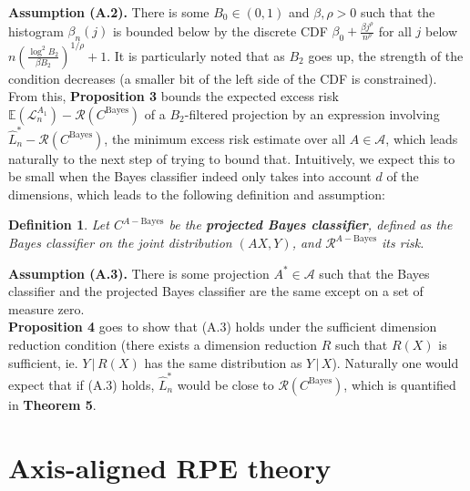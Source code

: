 \documentclass[ejs,preprint]{imsart}
\newtheorem{definition}{Definition}
\newcommand\cbayes{C^{\mathrm{Bayes}}}
\newcommand\risk{\mathcal{L}}
\newcommand\rrisk{\mathcal{R}}
\newcommand\cabayes{C^{A-\mathrm{Bayes}}}
\newcommand\rabayes{\rrisk^{A-\mathrm{Bayes}}}
\begin{document}
\noindent \textbf{Assumption (A.2).} There is some $B_{0}\in(0,1)$
and $\beta,\rho>0$ such that the histogram $\beta_{n}(j)$ is bounded
below by the discrete CDF $\beta_{0}+\frac{\beta j^{\rho}}{n^{\rho}}$
for all $j$ below $n\left(\frac{\log^{2}B_{2}}{\beta B_{2}}\right)^{1/\rho}+1$.
It is particularly noted that as $B_{2}$ goes up, the strength of
the condition decreases (a smaller bit of the left side of the CDF
is constrained).\\


From this, \textbf{Proposition 3} bounds the expected excess risk
$\mathbb{E}(\risk_{n}^{A_{1}})-\rrisk(\cbayes)$ of a $B_{2}$-filtered
projection by an expression involving $\hat{L}_{n}^{*}-\rrisk(\cbayes)$,
the minimum excess risk estimate over all $A\in\mathcal A$,
which leads naturally to the next step of trying to bound that. Intuitively,
we expect this to be small when the Bayes classifier indeed only takes
into account $d$ of the dimensions, which leads to the following
definition and assumption:

\begin{definition}
Let $\cabayes$ be the \textbf{projected Bayes classifier}, defined
as the Bayes classifier on the joint distribution $(AX,Y)$, and $\rabayes$
its risk.
\end{definition}


\noindent \textbf{Assumption (A.3).} There is some projection $A^{*}\in\mathcal{A}$
such that the Bayes classifier and the projected Bayes classifier
are the same except on a set of measure zero.\\


\textbf{Proposition 4} goes to show that (A.3) holds under the sufficient
dimension reduction condition (there exists a dimension reduction
$R$ such that $R(X)$ is sufficient, ie. $Y\,|\,R(X)$ has the same
distribution as $Y\,|\,X$). Naturally one would expect that if (A.3)
holds, $\hat{L}_{n}^{*}$ would be close to $\rrisk(\cbayes)$, which
is quantified in \textbf{Theorem 5}.





















\section{Axis-aligned RPE theory}
\end{document}

